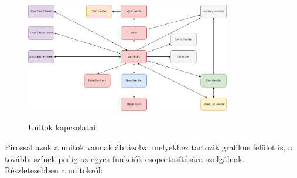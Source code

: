 \begin{figure}[h]
	\begin{center}
		\caption{Unitok kapcsolatai}
		\includegraphics[width=0.8\textwidth, keepaspectratio=true]{images/unitok_kapcsolati_abra}\\
		\label{fig:example}
	\end{center}
\end{figure}

Pirossal azok a unitok vannak ábrázolva melyekhez tartozik grafikus felület is, a további színek pedig az egyes funkciók csoportosítására szolgálnak. Részletesebben a unitokról:

